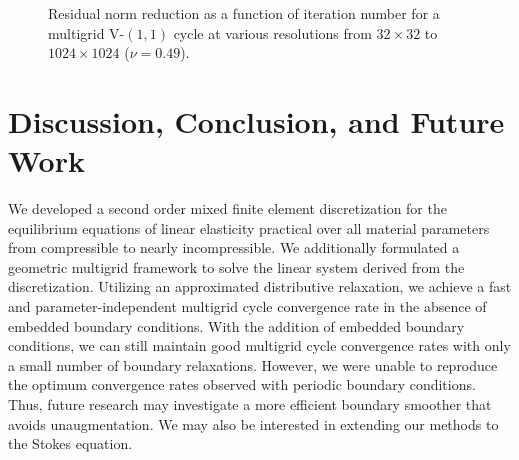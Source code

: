 \setlength{\figurewidth}{0.45\columnwidth}
\begin{figure}[htbp]
\begin{center}
\caption{Residual norm reduction as a function of iteration number for a multigrid V-$(1,1)$ cycle at various resolutions from $32 \times 32$ to $1024 \times 1024$ ($\nu = 0.49$).}
\label{fig:ch5.multigrid.convergence.flower.b}
\end{center}
\end{figure}

\section{Discussion, Conclusion, and Future Work}

We developed a second order mixed finite element discretization for the equilibrium equations of linear elasticity practical over all material parameters from compressible to nearly incompressible. We additionally formulated a geometric multigrid framework to solve the linear system derived from the discretization. Utilizing an approximated distributive relaxation, we achieve a fast and parameter-independent multigrid cycle convergence rate in the absence of embedded boundary conditions. With the addition of embedded boundary conditions, we can still maintain good multigrid cycle convergence rates with only a small number of boundary relaxations. However, we were unable to reproduce the optimum convergence rates observed with periodic boundary conditions. Thus, future research may investigate a more efficient boundary smoother that avoids unaugmentation. We may also be interested in extending our methods to the Stokes equation.

